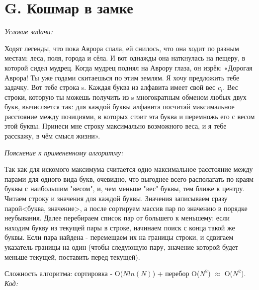 \section{G. Кошмар в замке}
\textit{Условие задачи:} \par
Ходят легенды, что пока Аврора спала, ей снилось, что она ходит по разным местам: леса, поля, города и сёла.
И вот однажды она наткнулась на пещеру, в которой сидел мудрец. Когда мудрец поднял на Аврору глаза, он изрёк: «Дорогая Аврора!
Ты уже годами скитаешься по этим землям. Я хочу предложить тебе задачку. Вот тебе строка s. Каждая буква из алфавита имеет
свой вес $c_i$. Вес строки, которую ты можешь получить из s многократным обменом любых двух букв, вычисляется так: для каждой
буквы алфавита посчитай максимальное расстояние между позициями, в которых стоит эта буква и перемножь его с весом этой буквы.
Принеси мне строку максимально возможного веса, и я тебе расскажу, в чём смысл жизни».\par
\textit{Пояснение к примененному алгоритму:} \par
Так как для искомого максимума считается одно максимальное расстояние между парами для одного вида букв, очевидно, что
выгоднее всего располагать по краям буквы с наибольшим "весом", и, чем меньше "вес" буквы, тем ближе к центру.
Читаем строку и значения для каждой буквы. Значения записываем сразу парой<буква, значение>, а после сортируем массив пар
по значению в порядке неубывания. Далее перебираем список пар от большего к меньшему: если находим букву из текущей пары в строке, начинаем поиск с конца такой же буквы.
Если пара найдена - перемещаем их на границы строки, и сдвигаем указатель границы на один (чтобы следующую пару, значение которой будет меньше текущей, поставить перед текущей).\par
Сложность алгоритма: сортировка - O($Nln(N)$) + перебор O($N^2$) $\approx$ O($N^2$).
\BgThispage
\newpage
\textit{Код:}
\small
